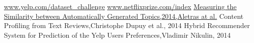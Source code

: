 \documentclass[a4paper, 10pt, conference]{ieeeconf}      %
\begin{document}




\twocolumn
\begin{thebibliography}{99}

\href{www.yelp.com/dataset_challenge}{www.yelp.com/dataset\_challenge}
\href{www.netflixprize.com/index}{www.netflixprize.com/index}
\href{http://www.aclweb.org/anthology/E14-4#page=42}{Measuring the Similarity between Automatically Generated Topics,2014,Aletras at al.}
Content Profiling from Text Reviews,Christophe Dupuy et al., 2014
Hybrid Recommender System for Prediction of the Yelp Users Preferences,Vladimir Nikulin, 2014
\end{thebibliography}
\end{document}
